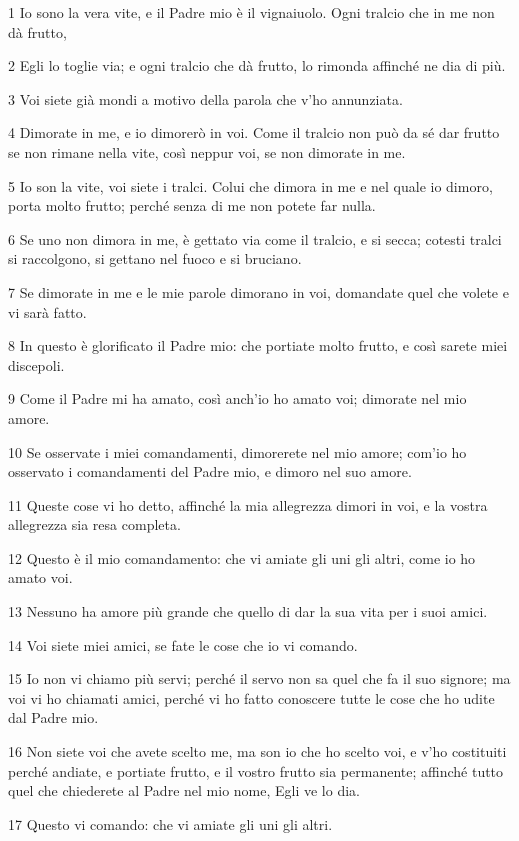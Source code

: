 \par 1 Io sono la vera vite, e il Padre mio è il vignaiuolo. Ogni tralcio che in me non dà frutto,
\par 2 Egli lo toglie via; e ogni tralcio che dà frutto, lo rimonda affinché ne dia di più.
\par 3 Voi siete già mondi a motivo della parola che v'ho annunziata.
\par 4 Dimorate in me, e io dimorerò in voi. Come il tralcio non può da sé dar frutto se non rimane nella vite, così neppur voi, se non dimorate in me.
\par 5 Io son la vite, voi siete i tralci. Colui che dimora in me e nel quale io dimoro, porta molto frutto; perché senza di me non potete far nulla.
\par 6 Se uno non dimora in me, è gettato via come il tralcio, e si secca; cotesti tralci si raccolgono, si gettano nel fuoco e si bruciano.
\par 7 Se dimorate in me e le mie parole dimorano in voi, domandate quel che volete e vi sarà fatto.
\par 8 In questo è glorificato il Padre mio: che portiate molto frutto, e così sarete miei discepoli.
\par 9 Come il Padre mi ha amato, così anch'io ho amato voi; dimorate nel mio amore.
\par 10 Se osservate i miei comandamenti, dimorerete nel mio amore; com'io ho osservato i comandamenti del Padre mio, e dimoro nel suo amore.
\par 11 Queste cose vi ho detto, affinché la mia allegrezza dimori in voi, e la vostra allegrezza sia resa completa.
\par 12 Questo è il mio comandamento: che vi amiate gli uni gli altri, come io ho amato voi.
\par 13 Nessuno ha amore più grande che quello di dar la sua vita per i suoi amici.
\par 14 Voi siete miei amici, se fate le cose che io vi comando.
\par 15 Io non vi chiamo più servi; perché il servo non sa quel che fa il suo signore; ma voi vi ho chiamati amici, perché vi ho fatto conoscere tutte le cose che ho udite dal Padre mio.
\par 16 Non siete voi che avete scelto me, ma son io che ho scelto voi, e v'ho costituiti perché andiate, e portiate frutto, e il vostro frutto sia permanente; affinché tutto quel che chiederete al Padre nel mio nome, Egli ve lo dia.
\par 17 Questo vi comando: che vi amiate gli uni gli altri.

